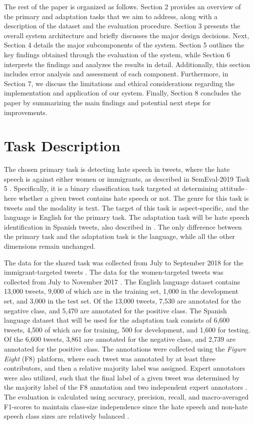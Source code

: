 \documentclass[11pt,a4paper]{article}
\begin{document}
    The rest of the paper is organized as follows. Section 2 provides an overview of the primary and adaptation tasks that we aim to address, along with a description of the dataset and the evaluation procedure. Section 3 presents the overall system architecture and briefly discusses the major design decisions. Next, Section 4 details the major subcomponents of the system. Section 5 outlines the key findings obtained through the evaluation of the system, while Section 6 interprets the findings and analyzes the results in detail. Additionally, this section includes error analysis and assessment of each component. Furthermore, in Section 7, we discuss the limitations and ethical considerations regarding the implementation and application of our system. Finally, Section 8 concludes the paper by summarizing the main findings and potential next steps for improvements.


\section{Task Description}
    The chosen primary task is detecting hate speech in tweets, where the hate speech is against either women or immigrants, as described in SemEval-2019 Task 5 \citep{basile-etal-2019-semeval}. Specifically, it is a binary classification task targeted at determining attitude–here whether a given tweet contains hate speech or not. The genre for this task is tweets and the modality is text. The target of this task is aspect-specific, and the language is English for the primary task. The adaptation task will be hate speech identification in Spanish tweets, also described in \citet{basile-etal-2019-semeval}. The only difference between the primary task and the adaptation task is the language, while all the other dimensions remain unchanged.

   The data for the shared task was collected from July to September 2018 for the immigrant-targeted tweets \citep{basile-etal-2019-semeval}. The data for the women-targeted tweets was collected from July to November 2017 \citep{fersini2018overview}. The English language dataset contains 13,000 tweets, 9,000 of which are in the training set, 1,000 in the development set, and 3,000 in the test set. Of the 13,000 tweets, 7,530 are annotated for the negative class, and 5,470 are annotated for the positive class. The Spanish language dataset that will be used for the adaptation task consists of 6,600 tweets, 4,500 of which are for training, 500 for development, and 1,600 for testing. Of the 6,600 tweets, 3,861 are annotated for the negative class, and 2,739 are annotated for the positive class. The annotations were collected using the \textit{Figure Eight} (F8) platform, where each tweet was annotated by at least three contributors, and then a relative majority label was assigned. Expert annotators were also utilized, such that the final label of a given tweet was determined by the majority label of the F8 annotation and two independent expert annotators \citep{basile-etal-2019-semeval}. The evaluation is calculated using accuracy, precision, recall, and macro-averaged F1-scores to maintain class-size independence since the hate speech and non-hate speech class sizes are relatively balanced \citep{basile-etal-2019-semeval}.
   
\end{document}
